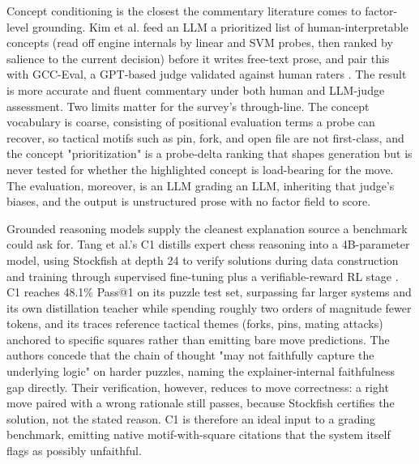 \documentclass[conference]{IEEEtran}
\begin{document}
Concept conditioning is the closest the commentary literature comes to factor-level grounding. Kim et al. feed an LLM a prioritized list of human-interpretable concepts (read off engine internals by linear and SVM probes, then ranked by salience to the current decision) before it writes free-text prose, and pair this with GCC-Eval, a GPT-based judge validated against human raters \cite{ref11}. The result is more accurate and fluent commentary under both human and LLM-judge assessment. Two limits matter for the survey's through-line. The concept vocabulary is coarse, consisting of positional evaluation terms a probe can recover, so tactical motifs such as pin, fork, and open file are not first-class, and the concept "prioritization" is a probe-delta ranking that shapes generation but is never tested for whether the highlighted concept is load-bearing for the move. The evaluation, moreover, is an LLM grading an LLM, inheriting that judge's biases, and the output is unstructured prose with no factor field to score.

Grounded reasoning models supply the cleanest explanation source a benchmark could ask for. Tang et al.'s C1 distills expert chess reasoning into a 4B-parameter model, using Stockfish at depth 24 to verify solutions during data construction and training through supervised fine-tuning plus a verifiable-reward RL stage \cite{ref12}. C1 reaches 48.1\% Pass@1 on its puzzle test set, surpassing far larger systems and its own distillation teacher while spending roughly two orders of magnitude fewer tokens, and its traces reference tactical themes (forks, pins, mating attacks) anchored to specific squares rather than emitting bare move predictions. The authors concede that the chain of thought "may not faithfully capture the underlying logic" on harder puzzles, naming the explainer-internal faithfulness gap directly. Their verification, however, reduces to move correctness: a right move paired with a wrong rationale still passes, because Stockfish certifies the solution, not the stated reason. C1 is therefore an ideal input to a grading benchmark, emitting native motif-with-square citations that the system itself flags as possibly unfaithful.
\end{document}
